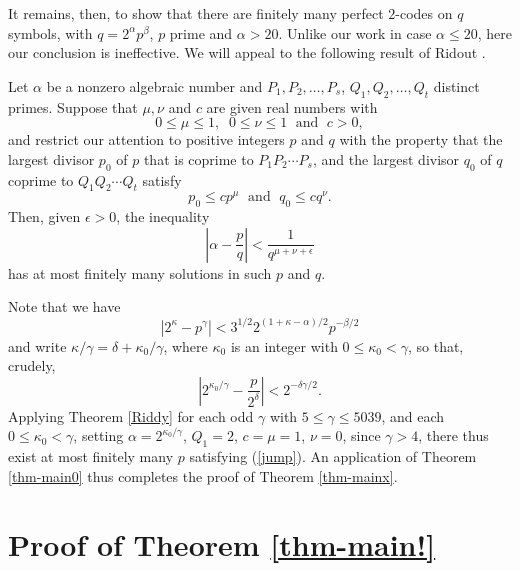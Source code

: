 \documentclass{amsart}
\begin{document}
{It remains, then, to show that there are finitely many perfect $2$-codes on $q$ symbols, with $q=2^\alpha p^\beta$, $p$ prime and $\alpha > 20$. Unlike our work in case $\alpha \leq 20$, here our conclusion is ineffective. We will appeal to the following result of Ridout \cite{Rid}.
\begin{thm}[Ridout]\label{Riddy}
Let $\alpha$ be a nonzero algebraic number and $P_1, P_2, \ldots, P_s$, $Q_1, Q_2, \ldots, Q_t$  distinct primes. Suppose that $\mu, \nu$ and $c$ are given real numbers with
$$
0 \leq \mu \leq 1, \; \; 0 \leq \nu \leq 1 \;  \mbox{ and }  \; c > 0,
$$
and restrict our attention to positive integers $p$ and $q$ with the property that the largest divisor $p_0$ of $p$ that is coprime to $P_1P_2 \cdots P_s$, and the largest divisor $q_0$ of $q$  coprime to $Q_1Q_2 \cdots Q_t$ satisfy
$$
p_0 \leq c p^\mu \; \mbox{ and } \; q_0 \leq c q^\nu.
$$
Then, given $\epsilon > 0$, the inequality
$$
\left| \alpha - \frac{p}{q} \right| < \frac{1}{q^{\mu+\nu+\epsilon}}
$$
has at most finitely many solutions in such $p$ and $q$.
\end{thm}

Note that we have
\begin{equation} \label{knife}
\left|  2^\kappa-p^\gamma \right| < 3^{1/2} 2^{(1+\kappa-\alpha)/2 } p^{-\beta/2}
\end{equation}
and write $\kappa/\gamma = \delta+\kappa_0/\gamma$, where $\kappa_0$ is an integer with $0 \leq \kappa_0 < \gamma$, so that,
crudely,
\begin{equation} \label{jump}
\left| 2^{\kappa_0/\gamma} - \frac{p}{2^\delta} \right| < 2^{-\delta \gamma/2}.
\end{equation}
Applying Theorem \ref{Riddy} for each odd $\gamma$ with $5 \leq \gamma \leq 5039$, and each $0 \leq \kappa_0 < \gamma$, setting $\alpha =2^{\kappa_0/\gamma}$, $Q_1=2$, $c=\mu=1$, $\nu=0$,
since $\gamma > 4$, there thus exist at most finitely many $p$ satisfying (\ref{jump}). An application of Theorem \ref{thm-main0}
thus completes the proof of Theorem \ref{thm-mainx}.

\section{Proof of Theorem \ref{thm-main!}}

}
\end{document}

